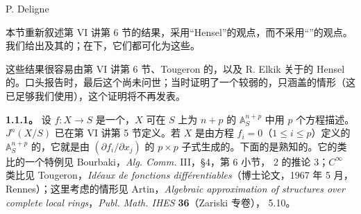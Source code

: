 \begin{center}P. Deligne\end{center}
本节重新叙述第 VI 讲第 6 节的结果，采用“Hensel”的观点，而不采用“”的观点。我们给出及其的；在下，它们都可化为这些。

这些结果很容易由第 VI 讲第 6 节、Tougeron 的，以及 R. Elkik 关于的 Hensel 的。口头报告时，最后这个尚未问世；当时证明了一个较弱的，只涵盖的情形（这已足够我们使用），这个证明将不再发表。

\textbf{1.1.1。} 设 $f:X\to S$ 是一个，$X$ 可在 $S$ 上为 $n+p$ 的 $\mathbb A_S^{n+p}$ 中用 $p$ 个方程描述。 $J^n(X/S)$ 已在第 VI 讲第 5 节定义。若 $X$ 是由方程 $f_i=0$（$1\leq i\leq p$）定义的 $\mathbb A_S^{n+p}$ 的，它就是由  $(\partial f_i/\partial x_j)$ 的 $p\times p$ 子式生成的。下面的是熟知的。它的类比的一个特例见 Bourbaki，\textit{Alg. Comm.} III，§4，第 6 小节， 2 的推论 3；$C^\infty$ 类比见 Tougeron，\textit{Idéaux de fonctions différentiables}（博士论文，1967 年 5 月，Rennes）；这里考虑的情形见 Artin，\textit{Algebraic approximation of structures over complete local rings}，\textit{Publ. Math. IHES} \textbf{36}（Zariski 专卷）， 5.10。


